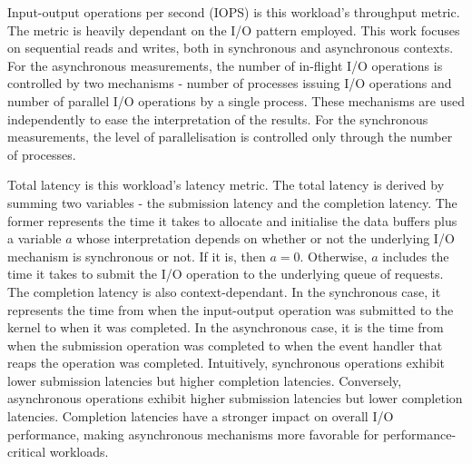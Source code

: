 Input-output operations per second (IOPS) is this workload's throughput metric.
The metric is heavily dependant on the I/O pattern employed. 
This work focuses on sequential reads and writes, both in synchronous and asynchronous contexts.
For the asynchronous measurements, the number of in-flight I/O operations is controlled by 
two mechanisms - number of processes issuing I/O operations and number of parallel I/O operations 
by a single process. These mechanisms are used independently to ease the interpretation of the results.
For the synchronous measurements, the level of parallelisation is controlled only through the number 
of processes.

Total latency is this workload's latency metric. The total latency is derived by summing 
two variables - the submission latency and the completion latency. The former represents 
the time it takes to allocate and initialise the data buffers plus a variable $a$ whose interpretation 
depends on whether or not the underlying I/O mechanism is synchronous or not.  
If it is, then $a = 0$. Otherwise, $a$ includes the time it takes to submit the I/O operation
to the underlying queue of requests. The completion latency is also context-dependant. 
In the synchronous case, it represents the time from when the input-output operation was submitted 
to the kernel to when it was completed. In the asynchronous case, it is the time from 
when the submission operation was completed to when the event handler that reaps the operation 
was completed. Intuitively, synchronous operations exhibit lower submission latencies but higher 
completion latencies. Conversely, asynchronous operations exhibit higher submission latencies 
but lower completion latencies. Completion latencies have a stronger impact on overall 
I/O performance, making asynchronous mechanisms more favorable for performance-critical workloads.   
